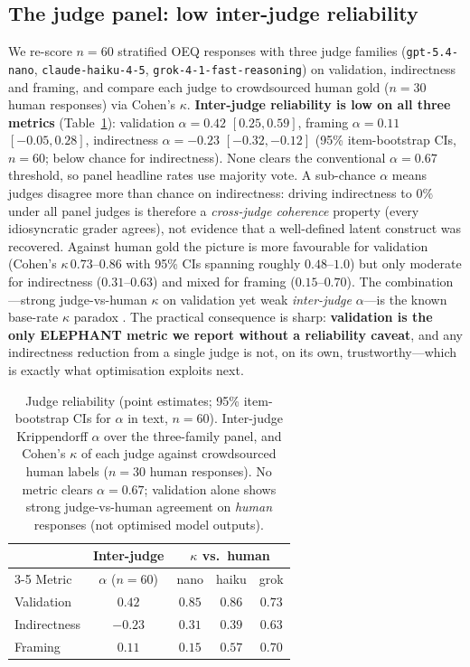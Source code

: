 \documentclass[11pt]{article}
\newcommand{\nano}{\texttt{gpt-5.4-nano}}
\newcommand{\haiku}{\texttt{claude-haiku-4-5}}
\newcommand{\grok}{\texttt{grok-4-1-fast-reasoning}}
\begin{document}
\subsection{The judge panel: low inter-judge reliability}
We re-score $n{=}60$ stratified OEQ responses with three judge families (\nano, \haiku, \grok) on
validation, indirectness and framing, and compare each judge to crowdsourced human gold ($n{=}30$ human
responses) via Cohen's $\kappa$. \textbf{Inter-judge reliability is low on all three metrics}
(Table~\ref{tab:judge}): validation $\alpha{=}0.42$ $[0.25, 0.59]$, framing $\alpha{=}0.11$
$[-0.05, 0.28]$, indirectness $\alpha{=}-0.23$ $[-0.32, -0.12]$ (95\% item-bootstrap CIs, $n{=}60$;
below chance for indirectness). None clears the conventional $\alpha{=}0.67$ threshold, so panel headline rates use
majority vote. A sub-chance $\alpha$ means judges disagree more than chance on indirectness: driving
indirectness to $0\%$ under all panel judges is therefore a \emph{cross-judge coherence} property
(every idiosyncratic grader agrees), not evidence that a well-defined latent construct was recovered.
Against human gold the picture is more favourable for validation (Cohen's $\kappa\,0.73$--$0.86$ with
95\% CIs spanning roughly $0.48$--$1.0$) but only moderate for indirectness ($0.31$--$0.63$) and mixed
for framing ($0.15$--$0.70$). The combination---strong judge-vs-human $\kappa$ on validation yet weak
\emph{inter-judge} $\alpha$---is the known base-rate $\kappa$ paradox \citep{feinstein90kappa}. The
practical consequence is sharp: \textbf{validation is the only ELEPHANT metric we report without a
reliability caveat}, and any indirectness reduction from a single judge is not, on its own,
trustworthy---which is exactly what optimisation exploits next.

\begin{table}[t]
\centering
\small
\setlength{\tabcolsep}{4pt}
\begin{tabular}{lcccc}
\toprule
 & Inter-judge & \multicolumn{3}{c}{$\kappa$ vs.\ human} \\
\cmidrule(lr){3-5}
Metric & $\alpha$ ($n{=}60$) & nano & haiku & grok \\
\midrule
Validation   & $0.42$  & $0.85$ & $0.86$ & $0.73$ \\
Indirectness & $-0.23$ & $0.31$ & $0.39$ & $0.63$ \\
Framing      & $0.11$  & $0.15$ & $0.57$ & $0.70$ \\
\bottomrule
\end{tabular}
\caption{Judge reliability (point estimates; 95\% item-bootstrap CIs for $\alpha$ in text,
$n{=}60$). Inter-judge Krippendorff $\alpha$ over the three-family panel, and Cohen's $\kappa$ of each
judge against crowdsourced human labels ($n{=}30$ human responses). No metric clears $\alpha{=}0.67$;
validation alone shows strong judge-vs-human agreement on \emph{human} responses (not optimised model
outputs).}
\label{tab:judge}
\end{table}
\end{document}
